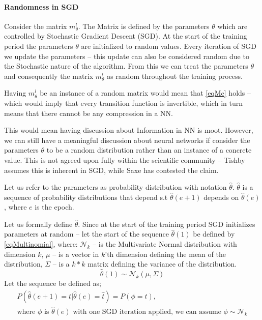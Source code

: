 \documentclass[dissertation.tex]{subfiles}
\begin{document}
\paragraph{Randomness in SGD} 
Consider the matrix $m_\theta^l$. The Matrix is defined by the parameters
$\theta$ which are controlled by Stochastic Gradient Descent (SGD). At the start
of the training period the parameters $\theta$ are initialized to random values.
Every iteration of SGD we update the parameters -- this update can also be
considered random due to the Stochastic nature of the algorithm. From this we
can treat the parameters $\theta$ and consequently the matrix $m_\theta^l$ as
random throughout the training process.

Having $m_\theta^l$ be an instance of a random matrix would mean that
\autoref{eqMc} holds -- which would imply that every transition function is
invertible, which in turn means that there cannot be any compression in a NN.

This would mean having discussion about Information in NN is moot. However, we
can still have a meaningful discussion about neural networks if consider the
parameters $\theta$ to be a random distribution rather than an instance of a
concrete value. This is not agreed upon fully within the scientific community --
Tishby assumes this is inherent in SGD, while Saxe has contested the claim.

Let us refer to the parameters as probability distribution with notation
$\hat\theta$. $\hat\theta$ is a sequence of probability distributions that
depend s.t $\hat\theta(e+1)$ depends on $\hat\theta(e)$, where $e$ is the epoch.

Let us formally define $\hat\theta$. Since at the start of the training period
SGD initializes parameters at random -- let the start of the sequence
$\hat\theta(1)$ be defined by \autoref{eqMultinomial}, where: $\mathcal{N}_k$ --
is the Multivariate Normal distribution with dimension $k$, $\mu$ -- is a vector
in $k$'th dimension defining the mean of the distribution, $\Sigma$ -- is a
$k*k$ matrix defining the variance of the distribution.
\begin{equation}
  \hat\theta(1)\sim\mathcal{N}_k(\mu,\Sigma)
  \label{eqMultinomial}
\end{equation}
Let the sequence be defined as;
\begin{gather}
  P(\hat\theta(e+1) = t | \hat\theta(e) = \hat{t}) = P(\phi = t), \\
  \text{where }\phi
  \text{ is }\hat\theta(e)
  \text{ with one SGD iteration applied, we can assume }
  \phi\sim\mathcal{N}_k
  \label{eqSequence}
\end{gather}
\end{document}
